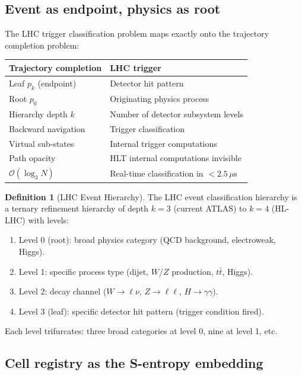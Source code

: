 \documentclass[twocolumn,10pt,a4paper]{article}
\theoremstyle{thmstyle}
\theoremstyle{definition}
\newtheorem{definition}[theorem]{Definition}
\theoremstyle{remark}
\begin{document}
\subsection{Event as endpoint, physics as root}

The LHC trigger classification problem maps exactly onto the trajectory
completion problem:

\begin{center}
\begin{tabular}{ll}
\toprule
\textbf{Trajectory completion} & \textbf{LHC trigger} \\
\midrule
Leaf $p_k$ (endpoint) & Detector hit pattern \\
Root $p_0$ & Originating physics process \\
Hierarchy depth $k$ & Number of detector subsystem levels \\
Backward navigation & Trigger classification \\
Virtual sub-states & Internal trigger computations \\
Path opacity & HLT internal computations invisible \\
$\mathcal{O}(\log_3 N)$ & Real-time classification in $<2.5\,\mu$s \\
\bottomrule
\end{tabular}
\end{center}

\begin{definition}[LHC Event Hierarchy]
\label{def:lhc_hierarchy}
The LHC event classification hierarchy is a ternary refinement hierarchy
of depth $k = 3$ (current ATLAS) to $k = 4$ (HL-LHC) with levels:
\begin{enumerate}[nosep,label=(\arabic*)]
\item Level 0 (root): broad physics category (QCD background, electroweak, Higgs).
\item Level 1: specific process type (dijet, $W$/$Z$ production, $t\bar t$, Higgs).
\item Level 2: decay channel ($W \to \ell\nu$, $Z \to \ell\ell$, $H \to \gamma\gamma$).
\item Level 3 (leaf): specific detector hit pattern (trigger condition fired).
\end{enumerate}
Each level trifurcates: three broad categories at level 0, nine at level 1, etc.
\end{definition}

\subsection{Cell registry as the S-entropy embedding}
\end{document}
